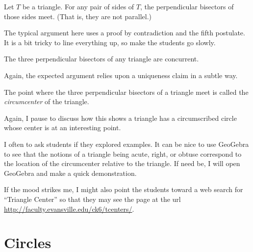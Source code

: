 \begin{conjecture}\label{conj:meeting-perp-bisectors}
Let $T$ be a triangle. For any pair of sides of $T$, the perpendicular bisectors of those sides meet. (That is, they are not parallel.)
\end{conjecture}

\begin{annotation}
{
\color{blue}
The typical argument here uses a proof by contradiction and the fifth postulate. It is a bit tricky to line everything up, so make the students go slowly.
}
\end{annotation}

\begin{conjecture}\label{conj:circumcenter}
The three perpendicular bisectors of any triangle are concurrent.
\end{conjecture}

\begin{annotation}
{
\color{blue}
Again, the expected argument relies upon a uniqueness claim in a subtle way.
}
\end{annotation}

\begin{definition}\label{defn:circumcenter}
The point where the three perpendicular bisectors of a triangle meet is called the \emph{circumcenter} of the triangle.
\end{definition}

\begin{annotation}
{
\color{blue}
Again, I pause to discuss how this shows a triangle has a circumscribed circle whose center is at an interesting point.

I often to ask students if they explored examples. It can be nice to use GeoGebra to see that the notions of a triangle being acute, right, or obtuse correspond to the location of the circumcenter relative to the triangle. If need be, I will open GeoGebra and make a quick demonstration.


If the mood strikes me, I might also point the students toward a web search for ``Triangle Center'' so that they may see the page at the url \url{http://faculty.evansville.edu/ck6/tcenters/}.
}
\end{annotation}



\chapter{Circles}

